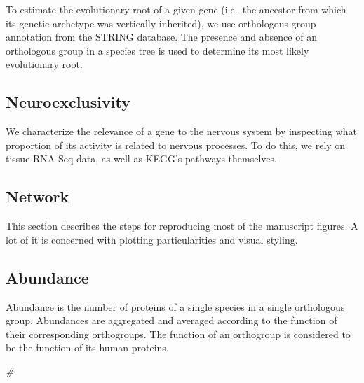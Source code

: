 \documentclass[
]{article}
\newenvironment{Shaded}{\begin{snugshade}}{\end{snugshade}}
\newcommand{\CommentTok}[1]{\textcolor[rgb]{0.33,0.33,0.33}{\textit{#1}}}
\renewenvironment{Shaded}{\scriptsize\begin{blackbox}}{\end{blackbox}}
\begin{document}
To estimate the evolutionary root of a given gene (i.e.~the ancestor
from which its genetic archetype was vertically inherited), we use
orthologous group annotation from the STRING database. The presence and
absence of an orthologous group in a species tree is used to determine
its most likely evolutionary root. 

\hypertarget{neuroexclusivity-1}{%
\subsection{Neuroexclusivity}\label{neuroexclusivity-1}}

We characterize the relevance of a gene to the nervous system by
inspecting what proportion of its activity is related to nervous
processes. To do this, we rely on tissue RNA-Seq data, as well as KEGG's
pathways themselves. 

\hypertarget{network-1}{%
\subsection{Network}\label{network-1}}

This section describes the steps for reproducing most of the manuscript
figures. A lot of it is concerned with plotting particularities and
visual styling. 

\hypertarget{abundance}{%
\subsection{Abundance}\label{abundance}}

Abundance is the number of proteins of a single species in a single
orthologous group. Abundances are aggregated and averaged according to
the function of their corresponding orthogroups. The function of an
orthogroup is considered to be the function of its human proteins.


\begin{Shaded}
\begin{Highlighting}[]
\CommentTok{#}
\end{Highlighting}
\end{Shaded}
\end{document}
